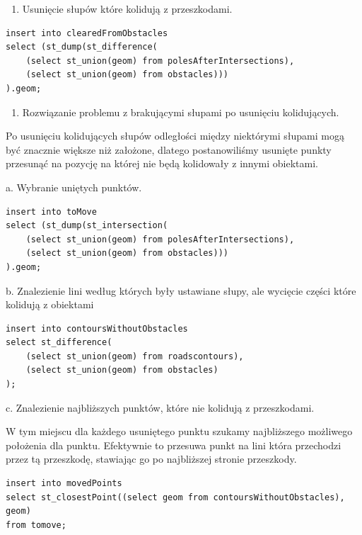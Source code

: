 \documentclass[11pt]{article}
\begin{document}
\begin{enumerate}
\item Usunięcie słupów które kolidują z przeszkodami.
\end{enumerate}

\begin{verbatim}
insert into clearedFromObstacles 
select (st_dump(st_difference(
    (select st_union(geom) from polesAfterIntersections),
    (select st_union(geom) from obstacles)))
).geom;
\end{verbatim}

\begin{enumerate}
\item Rozwiązanie problemu z brakującymi słupami po usunięciu kolidujących.
\end{enumerate}

Po usunięciu kolidujących słupów odległości między niektórymi słupami mogą być znacznie większe niż założone, dlatego postanowiliśmy usunięte punkty przesunąć na pozycję na której nie będą kolidowały z innymi obiektami. 

a. Wybranie uniętych punktów.

\begin{verbatim}
insert into toMove 
select (st_dump(st_intersection(
    (select st_union(geom) from polesAfterIntersections), 
    (select st_union(geom) from obstacles)))
).geom;
\end{verbatim}

b. Znalezienie lini według których były ustawiane słupy, ale wycięcie części które kolidują z obiektami

\begin{verbatim}
insert into contoursWithoutObstacles 
select st_difference(
    (select st_union(geom) from roadscontours), 
    (select st_union(geom) from obstacles)
);
\end{verbatim}

c. Znalezienie najbliższych punktów, które nie kolidują z przeszkodami. 

W tym miejscu dla każdego usuniętego punktu szukamy najbliższego możliwego położenia dla punktu. Efektywnie to przesuwa punkt na lini która przechodzi przez tą przeszkodę, stawiając go po najbliższej stronie przeszkody.

\begin{verbatim}
insert into movedPoints 
select st_closestPoint((select geom from contoursWithoutObstacles), geom) 
from tomove;
\end{verbatim}
\end{document}
